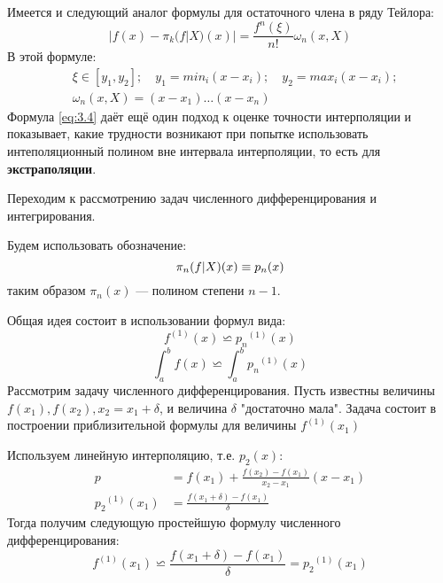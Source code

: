 Имеется и следующий аналог формулы для остаточного члена в ряду Тейлора:
\begin{equation} \label{eq:3.4}
	|f(x) - \pi_k(f|X)(x)| = \frac{f^{n}(\xi)}{n!} \omega_n (x,X)
\end{equation}
В этой формуле:
\begin{equation} \label{eq:3.5}
\begin{aligned}
	&\xi \in [y_1, y_2]; \quad y_1=min_{i}(x-x_i); \quad y_2=max_{i}(x-x_i) ;\\ 
	&\omega_n(x, X) = (x-x_1)\dots(x-x_n)
\end{aligned}
\end{equation}
Формула \ref{eq:3.4} даёт ещё один подход к оценке точности интерполяции и показывает, какие трудности возникают при попытке использовать интеполяционный полином вне интервала интерполяции, то есть для \textbf{экстраполяции}.

\bigskip
Переходим к рассмотрению задач численного дифференцирования и интегрирования. 

Будем использовать обозначение:
\begin{equation}
	\pi_n(f|X)(x) \equiv p_n(x)\\
\end{equation}
таким образом $\pi_n(x)$ --- полином степени $n-1$.

Общая идея состоит в использовании формул вида: 
\begin{equation} \label{eq:2.8}
	f^{(1)}(x) \backsimeq {p_n}^{(1)}(x)
\end{equation}
\begin{equation}
	\int_{a}^{b}f(x) \backsimeq \int_{a}^{b}{p_n}^{(1)}(x)
\end{equation}
Рассмотрим задачу численного дифференцирования. Пусть известны величины $f(x_1), f(x_2), x_2 = x_1 + \delta$, и величина $\delta$ "достаточно мала". Задача состоит в построении приблизительной формулы для величины $f^{(1)}(x_1)$

Используем линейную интерполяцию, т.е. $p_2(x)$:
\begin{equation}
	\begin{aligned}
	p &= f(x_1) + \frac{f(x_2) - f(x_1)}{x_2-x_1}(x-x_1) \\
	{p_2}^{(1)}(x_1) &= \frac{f(x_1+\delta) - f(x_1)}{\delta}
	\end{aligned}
\end{equation}
Тогда получим следующую простейшую формулу численного дифференцирования:
\begin{dmath} \label{eq:3.10}
	f^{(1)}(x_1) \backsimeq \frac{f(x_1 + \delta) - f(x_1)}{\delta} = {p_2}^{(1)}(x_1)
\end{dmath}

